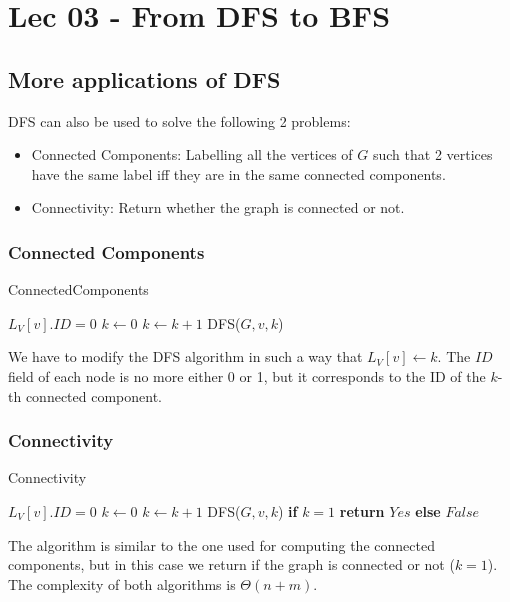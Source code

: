 \chapter{Lec 03 - From DFS to BFS}

\section{More applications of DFS}
DFS can also be used to solve the following 2 problems:
\begin{itemize}
    \item Connected Components: Labelling all the vertices of $G$ such that 2 vertices have the same label iff they are in the same connected components.
    \item Connectivity: Return whether the graph is connected or not. 
\end{itemize}

\subsection{Connected Components}
\begin{algorithm}
\caption{ConnectedComponents}\label{Conn.Comp.}
    \begin{algorithmic}[1]
            \State $L_{V}[v].ID = 0$
        \EndFor
        \State $k \gets 0$
                \State $k \gets k + 1$
                \State DFS($G, v, k$)
            \EndIf
        \EndFor
    \EndProcedure
    \end{algorithmic}
\end{algorithm}
We have to modify the DFS algorithm in such a way that $L_{V}[v] \gets k$. The $ID$ field of each node is no more either 0 or 1, but it corresponds to the ID of the $k$-th connected component. 

\subsection{Connectivity}
\begin{algorithm}
\caption{Connectivity}\label{Connectivity}
    \begin{algorithmic}[1]
            \State $L_{V}[v].ID = 0$
        \EndFor
        \State $k \gets 0$
                \State $k \gets k + 1$
                \State DFS($G, v, k$)
            \EndIf
        \EndFor
        \State \textbf{if} $k = 1$ \textbf{return} $Yes$ \textbf{else} $False$
    \EndProcedure
    \end{algorithmic}
\end{algorithm}
The algorithm is similar to the one used for computing the connected components, but in this case we return if the graph is connected or not ($k = 1$).\newline\newline
The complexity of both algorithms is $\Theta(n + m)$.

